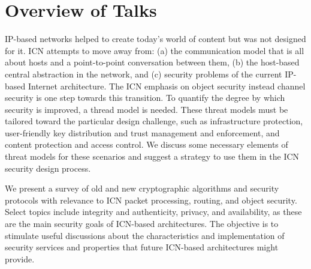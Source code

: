\documentclass[a4paper,UKenglish]{dagrep}
\begin{document}
\tableofcontents


\section{Overview of Talks}

\license

IP-based networks helped to create today's world of content but was not designed for it. ICN attempts to move away from: (a) the communication model that is all about hosts and a point-to-point conversation between them, (b) the host-based central abstraction in the network, and (c) security problems of the current IP-based Internet architecture. The ICN emphasis on object security instead channel security is one step towards this transition. To quantify the degree by which security is improved, a thread model is needed. These threat models must be tailored toward the particular design challenge, such as infrastructure protection, user-friendly key distribution and trust management and enforcement, and content protection and access control. We discuss some necessary elements of threat models for these scenarios and suggest a strategy to use them in the ICN security design process.

\license

We present a survey of old and new cryptographic algorithms and security protocols with relevance to ICN packet processing, routing, and object security. Select topics include integrity and authenticity, privacy, and availability, as these are the main security goals of ICN-based architectures. The objective is to stimulate useful discussions about the characteristics and implementation of security services and properties that future ICN-based architectures might provide.

\license
\end{document}
